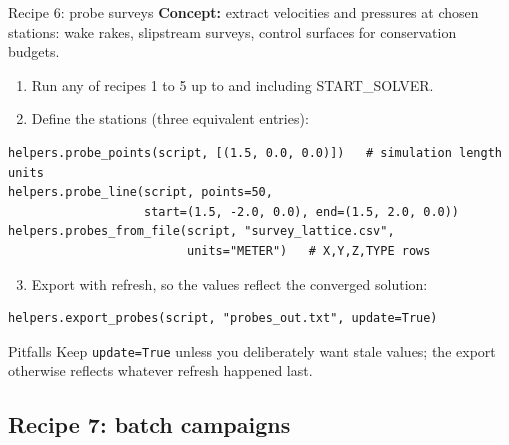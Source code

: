 \documentclass[aspectratio=169,10pt]{beamer}
\newcommand{\code}[1]{\texttt{\small #1}}
\begin{document}
\begin{frame}[fragile]{Recipe 6: probe surveys}
  \textbf{Concept:} extract velocities and pressures at chosen stations: wake rakes, slipstream surveys, control surfaces for conservation budgets.
  \begin{enumerate}
    \item Run any of recipes 1 to 5 up to and including START\_SOLVER.
    \item Define the stations (three equivalent entries):
  \end{enumerate}
\begin{lstlisting}
helpers.probe_points(script, [(1.5, 0.0, 0.0)])   # simulation length units
helpers.probe_line(script, points=50,
                   start=(1.5, -2.0, 0.0), end=(1.5, 2.0, 0.0))
helpers.probes_from_file(script, "survey_lattice.csv",
                         units="METER")   # X,Y,Z,TYPE rows
\end{lstlisting}
  \begin{enumerate}
    \setcounter{enumi}{2}
    \item Export with refresh, so the values reflect the converged solution:
  \end{enumerate}
\begin{lstlisting}
helpers.export_probes(script, "probes_out.txt", update=True)
\end{lstlisting}
  \begin{alertblock}{Pitfalls}
    Keep \code{update=True} unless you deliberately want stale values; the export otherwise reflects whatever refresh happened last.
  \end{alertblock}
\end{frame}

\subsection{Recipe 7: batch campaigns}
\end{document}

